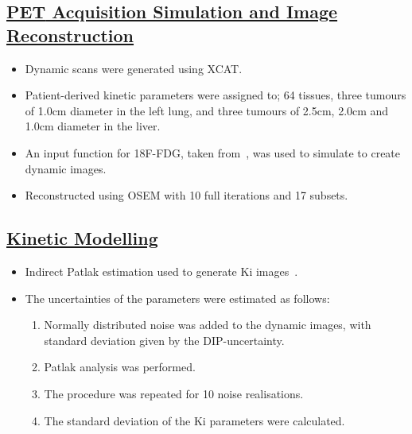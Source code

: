 \documentclass[portrait, color=UCLburgundy, margin=1cm]{uclposter}
\begin{document}
\begin{multicols}{2}
            \subsection*{\underline{\textbf{\acrshort{PET} Acquisition Simulation and Image Reconstruction}}}
                \begin{itemize}
                    \item Dynamic scans were generated using \acrshort{XCAT}.
                    \item Patient-derived kinetic parameters were assigned to; 64 tissues, three tumours of 1.0cm diameter in the left lung, and three tumours of 2.5cm, 2.0cm and 1.0cm diameter in the liver.
                    \item An input function for \acrshort{18F-FDG}, taken from~\cite{langsjoEffectsSubanestheticKetamine2004}, was used to simulate  to create dynamic images.
                    \item Reconstructed using \acrshort{OSEM} with 10 full iterations and 17 subsets.
                \end{itemize}
            
            \subsection*{\underline{\textbf{Kinetic Modelling}}}
                \begin{itemize}
                    \item Indirect Patlak estimation used to generate Ki images~\cite{patlak1983GraphicalEvaluationBloodtoBrain}.
                    \item The uncertainties of the parameters were estimated as follows:
                    
                    \begin{enumerate}
                        \item Normally distributed noise was added to the dynamic images, with standard deviation given by the \gls{DIP}-uncertainty.
                        \item Patlak analysis was performed.
                        \item The procedure was repeated for 10 noise realisations.
                        \item The standard deviation of the Ki parameters were calculated.
                    \end{enumerate}
                \end{itemize}
            

\end{multicols}
\end{document}
